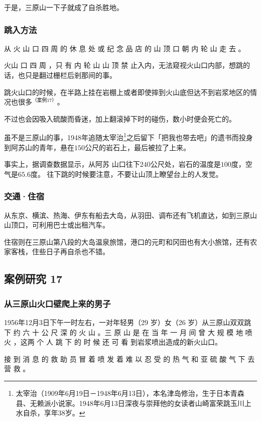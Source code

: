 \documentclass[UTF8]{ctexart}
\begin{document}
于是，三原山一下子就成了自杀胜地。

\subsubsection{跳入方法}

从 火 山 口 四 周 的 休 息 处 或 纪 念 品 店 的 山 顶 口 朝 内 轮 山 走 去 。

火山 口 四 周 ，只 有 内 轮 山 山 顶 禁 止入内，无法窥视火山口内部，想跳的话，也只是翻过栅栏后剎那间的事。 

跳火山口的时候，在半路上挂在岩棚上或者即使摔到火山底但达不到岩浆地区的情况也很多$^{（案例 17）}$。

不过也会因吸入硫酸而昏迷，加上翻滚掉下时的碰伤，数小时便会死亡的。 

虽不是三原山的事，1948年追随太宰治\footnote{太宰治（1909年6月19日－1948年6月13日），本名津岛修治，生于日本青森县、无赖派小说家。1948年6月13日深夜与崇拜他的女读者山崎富荣跳玉川上水自杀，享年38岁。}之后留下「把我也带去吧」的遗书而投身到阿苏山的青年，悬在$150$公尺的岩石上，最后被拉了上来。

事实上，据调查数据显示，从阿苏 山口往下$240$公尺处，岩石的温度是$100$度，空气$是65.6$度。 往下跳的时候要注意，不要让山顶上瞭望台上的人发觉。

\subsubsection{交通·住宿}

从东京、横滨、热海、伊东有船去大岛，从羽田、调布还有飞机直达，如到三原山山顶口，可利用巴士或出租汽车。

住宿则在三原山第八段的大岛温泉旅馆，港口的元町和冈田也有大小旅馆，还有农家客栈，住些日子再自杀也不错。


\subsection{案例研究 17}

\subsubsection*{从三原山火口壁爬上来的男子}

1956年12月3日下午一时左右，一对年轻男（29 岁）女（26 岁）从三原山双双跳下 约 六 十 公 尺 深 的 火 山 。三 原 山 是 在 当 年 一 月 间 曾 大 规 模 地 喷 火 ，这两 个 人 跳 下 的 时 候 还 可 看 到岩浆喷出造成的新火山口。

接 到 消 息 的 救 助 员 冒 着 喷 发 着 难 以 忍 受 的 热 气 和 亚 硫 酸 气 下 去 营 救 。
\end{document}
